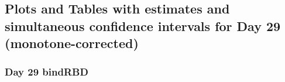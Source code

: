 \documentclass[]{article}
\begin{document}
\clearpage
\clearpage

\hypertarget{plots-and-tables-with-estimates-and-simultaneous-confidence-intervals-for-day-29-monotone-corrected-1}{%
\subsection{Plots and Tables with estimates and simultaneous confidence
intervals for Day 29
(monotone-corrected)}\label{plots-and-tables-with-estimates-and-simultaneous-confidence-intervals-for-day-29-monotone-corrected-1}}

\clearpage

\hypertarget{day-29-bindrbd-3}{%
\subsubsection{Day 29 bindRBD}\label{day-29-bindrbd-3}}
\end{document}
